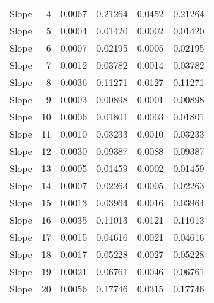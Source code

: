 \begin{table}[H]
\begin{tabular}{lrrrrr}
  Slope &   4 & 0.0067 & 0.21264 & 0.0452 & 0.21264 \\ 
  Slope &   5 & 0.0004 & 0.01420 & 0.0002 & 0.01420 \\ 
  Slope &   6 & 0.0007 & 0.02195 & 0.0005 & 0.02195 \\ 
  Slope &   7 & 0.0012 & 0.03782 & 0.0014 & 0.03782 \\ 
  Slope &   8 & 0.0036 & 0.11271 & 0.0127 & 0.11271 \\ 
  Slope &   9 & 0.0003 & 0.00898 & 0.0001 & 0.00898 \\ 
  Slope &  10 & 0.0006 & 0.01801 & 0.0003 & 0.01801 \\ 
  Slope &  11 & 0.0010 & 0.03233 & 0.0010 & 0.03233 \\ 
  Slope &  12 & 0.0030 & 0.09387 & 0.0088 & 0.09387 \\ 
  Slope &  13 & 0.0005 & 0.01459 & 0.0002 & 0.01459 \\ 
  Slope &  14 & 0.0007 & 0.02263 & 0.0005 & 0.02263 \\ 
  Slope &  15 & 0.0013 & 0.03964 & 0.0016 & 0.03964 \\ 
  Slope &  16 & 0.0035 & 0.11013 & 0.0121 & 0.11013 \\ 
  Slope &  17 & 0.0015 & 0.04616 & 0.0021 & 0.04616 \\ 
  Slope &  18 & 0.0017 & 0.05228 & 0.0027 & 0.05228 \\ 
  Slope &  19 & 0.0021 & 0.06761 & 0.0046 & 0.06761 \\ 
  Slope &  20 & 0.0056 & 0.17746 & 0.0315 & 0.17746 \\ 
   \hline
\end{tabular}
\end{table}

